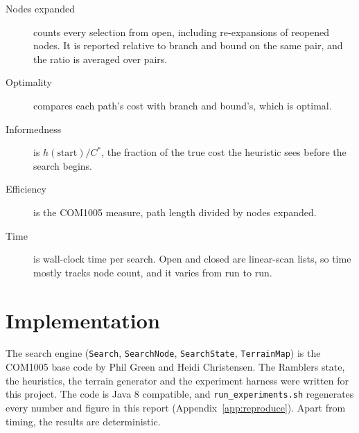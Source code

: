 \begin{description}
  \item[Nodes expanded] counts every selection from open, including re-expansions of reopened nodes. It is reported relative to branch and bound on the same pair, and the ratio is averaged over pairs.
  \item[Optimality] compares each path's cost with branch and bound's, which is optimal.
  \item[Informedness] is $h(\text{start})/C^*$, the fraction of the true cost the heuristic sees before the search begins.
  \item[Efficiency] is the COM1005 measure, path length divided by nodes expanded.
  \item[Time] is wall-clock time per search. Open and closed are linear-scan lists, so time mostly tracks node count, and it varies from run to run.
\end{description}


\section{Implementation}

The search engine (\texttt{Search}, \texttt{SearchNode}, \texttt{SearchState}, \texttt{TerrainMap}) is the COM1005 base code by Phil Green and Heidi Christensen. The Ramblers state, the heuristics, the terrain generator and the experiment harness were written for this project. The code is Java 8 compatible, and \texttt{run\_experiments.sh} regenerates every number and figure in this report (Appendix~\ref{app:reproduce}). Apart from timing, the results are deterministic.

